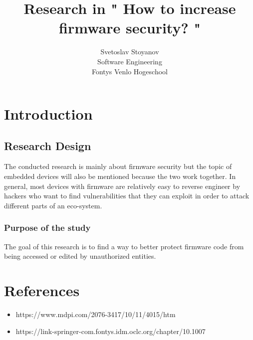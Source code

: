 \documentclass[]{report}
\begin{document}
\title{Research in " How to increase firmware security? " }
\author{Svetoslav Stoyanov \\
	Software Engineering \\
	Fontys Venlo Hogeschool}

\maketitle

\tableofcontents
\chapter{Introduction}
\section{Research Design}
The conducted research is mainly about firmware security but the topic of embedded devices will also be mentioned because the two work together. In general, most devices with firmware are relatively easy to reverse engineer by hackers who want to find vulnerabilities that they can exploit in order to attack different parts of an eco-system.


\subsection{Purpose of the study} 
The goal of this research is to find a way to better protect firmware code from being accessed or edited by unauthorized entities.
\chapter{References}
\begin{itemize}
	\item https://www.mdpi.com/2076-3417/10/11/4015/htm
	\item https://link-springer-com.fontys.idm.oclc.org/chapter/10.1007%
\end{itemize}
\end{document}
